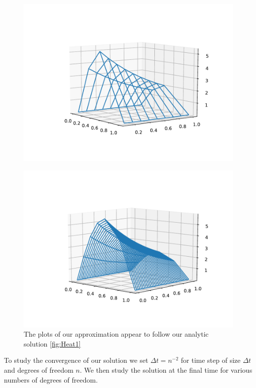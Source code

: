 \documentclass{uonmathreport}
\theoremstyle{definition}
\theoremstyle{problem}
\theoremstyle{theorem}
\begin{document}
\begin{figure}[h]
\caption{The plots of our approximation appear to follow our analytic solution \ref{fig:Heat1} }
\begin{minipage}{0.49\hsize}
  \label{fig:Heat1approx}
   \includegraphics[width=1.2\textwidth]{firstPDE3d.pdf}
  \end{minipage}
  \hfill
    \begin{minipage}{0.49\hsize}
    \vspace{5mm}
    \includegraphics[width=1.2\textwidth]{firstPDE3dfine.pdf}
\end{minipage}
    \end{figure}

To study the convergence of our solution we set $\Delta t = n^{-2} $ for time step of size $\Delta t$ and degrees of freedom $n$. We then study the solution at the final time for various numbers of degrees of freedom. 
\end{document}
